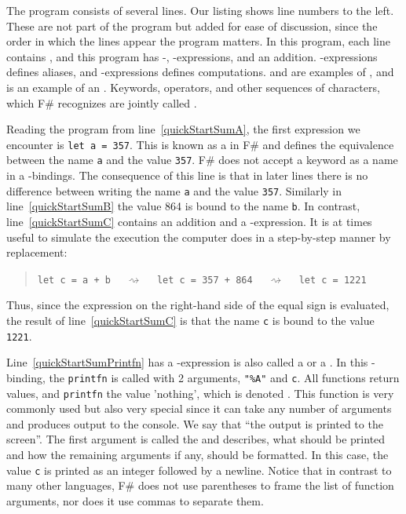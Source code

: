 \documentclass[fsharpNotes.tex]{subfiles}
\begin{document}
The program consists of several lines. Our listing shows line numbers to the left. These are not part of the program but added for ease of discussion, since the order in which the lines appear the program matters. In this program, each line contains , and this program has -, -expressions, and an addition. -expressions defines aliases, and -expressions defines computations.  and  are examples of , and \lexeme{+} is an example of an . Keywords, operators, and other sequences of characters, which F\# recognizes are jointly called .

Reading the program from line~\ref{quickStartSumA}, the first expression we encounter is \lstinline|let a = 357|. This is known as a  in F\# and defines the equivalence between the name \lstinline{a} and the value \lstinline{357}. F\# does not accept a keyword as a name in a -bindings. The consequence of this line is that in later lines there is no difference between writing the name \lstinline{a} and the value \lstinline{357}. Similarly in line~\ref{quickStartSumB} the value 864 is bound to the name \lstinline|b|. In contrast, line~\ref{quickStartSumC} contains an addition and a -expression. It is at times useful to simulate the execution the computer does in a step-by-step manner by replacement:
\begin{quote}
  \lstinline{let c = a + b} $\quad\rightsquigarrow\quad$  \lstinline{let c = 357 + 864}  $\quad\rightsquigarrow\quad$  \lstinline{let c = 1221}
\end{quote}
Thus, since the expression on the right-hand side of the equal sign is evaluated, the result of line~\ref{quickStartSumC} is that the name \lstinline{c} is bound to the value \lstinline{1221}.

Line~\ref{quickStartSumPrintfn} has a -expression is also called a  or a . In this -binding, the    \lstinline{printfn} is called with 2 arguments, \lstinline{"%A"}%
  and \lstinline{c}. All functions return values, and \lstinline|printfn| the value 'nothing', which is denoted \idx[{()}@\lstinline{()}]{\lexeme{()}}. This function is very commonly used but also very special since it can take any number of arguments and produces output to the console. We say that ``the output is printed to the screen''. The first argument is called the  and describes, what should be printed and how the remaining arguments if any, should be formatted. In this case, the value \lstinline{c} is printed as an integer followed by a newline. Notice that in contrast to many other languages, F\# does not use parentheses to frame the list of function arguments, nor does it use commas to separate them.
\end{document}
